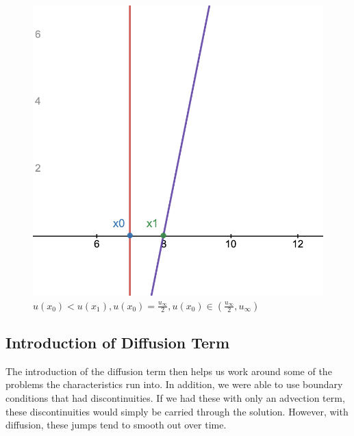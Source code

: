 \documentclass[12pt]{article}
\begin{document}
\begin{figure}[!htb]
		\caption{$u(x_0) > u(x_1), u(x_0), u(x_1) \in (\frac{u_\infty}{2}, u_\infty)$}\label{fig:no_shock_x1_x2_gt_half}
		\endminipage\hfill
		\includegraphics[width=\linewidth]{figures/no_shock_x0_eq_half.png}
		\caption{$u(x_0) < u(x_1), u(x_0) = \frac{u_\infty}{2},  u(x_0) \in (\frac{u_\infty}{2}, u_\infty) $}\label{fig:no_shock_x0_eq_half}
		\endminipage
	\end{figure}
	
	
	\subsection{Introduction of Diffusion Term}
	The introduction of the diffusion term then helps us work around some of the problems the characteristics run into. In addition, we were able to use boundary conditions that had discontinuities. If we had these with only an advection term, these discontinuities would simply be carried through the solution. However, with diffusion, these jumps tend to smooth out over time.
	
\end{document}
